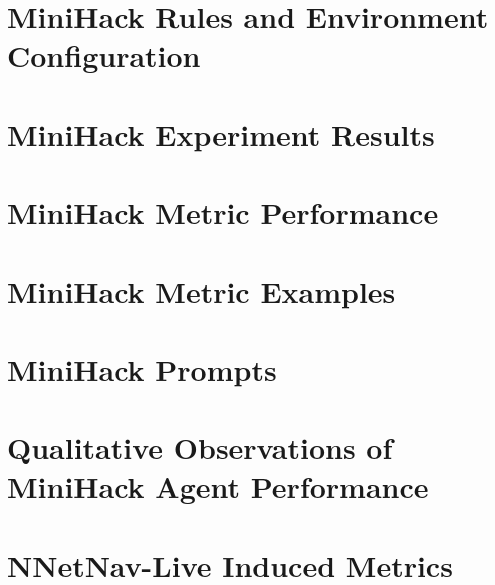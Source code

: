 \documentclass[../main.tex]{subfiles}
\begin{document}
\section{MiniHack Rules and Environment Configuration}
\label{appendix:minihack_rules}


\section{MiniHack Experiment Results}
\label{appendix:heldout_mini}


\section{MiniHack Metric Performance}
\label{appendix:minihack}

\newpage

\section{MiniHack Metric Examples}
\label{appendix:minihack_metrics}

\newpage

\section{MiniHack Prompts}
\label{appendix:minihack_prompts}

\newpage

\section{Qualitative Observations of MiniHack Agent Performance}
\label{appendix:minihack_obs}


\section{NNetNav-Live Induced Metrics}
\label{appendix:nnetnav_live}

\end{document}
